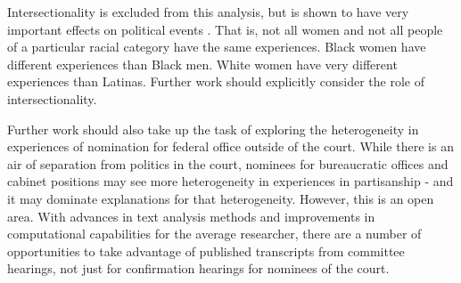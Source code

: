 \documentclass [12pt]{article}
\begin{document}
Intersectionality is excluded from this analysis, but is shown to have very important effects on political events \citep[see][]{phillips_2020_oxford}. That is, not all women and not all people of a particular racial category have the same experiences. Black women have different experiences than Black men. White women have very different experiences than Latinas. Further work should explicitly consider the role of intersectionality.

Further work should also take up the task of exploring the heterogeneity in experiences of nomination for federal office outside of the court. While there is an air of separation from politics in the court, nominees for bureaucratic offices and cabinet positions may see more heterogeneity in experiences in partisanship - and it may dominate explanations for that heterogeneity. However, this is an open area. With advances in text analysis methods and improvements in computational capabilities for the average researcher, there are a number of opportunities to take advantage of published transcripts from committee hearings, not just for confirmation hearings for nominees of the court. 


\newpage


\end{document}
